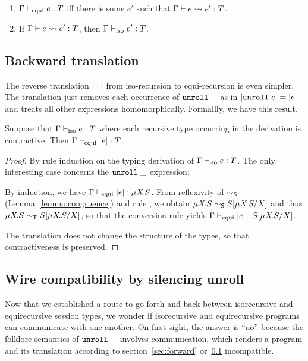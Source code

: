 \begin{lemma}
  \begin{enumerate}
  \item $\typing{\tyEqui e} T$ iff there is some $e'$ such that
    $\translation e {e'} T$.
  \item If $\translation e {e'} T$, then $\typing{\tyIso e'} T$.
  \end{enumerate}
\end{lemma}

\subsection{Backward translation}
\label{sec:backward-translation}

The reverse translation $\IsoToEqui\cdot$ from iso-recursion to equi-recursion is even
simpler. The translation just removes each occurrence of $\EUnroll\_$
as in $\IsoToEqui{\EUnroll e} = \IsoToEqui e$ and treats all other
expressions homomorphically. Formallly, we have this result.
\begin{lemma}
  Suppose that $\typing{\tyIso e}T$ where each recursive type
  occurring in the derivation is contractive.
  Then $\typing{\tyEqui \IsoToEqui{e}}T$.
\end{lemma}
\begin{proof}
  By rule induction on the typing derivation of  $\typing{\tyIso
    e}T$. The only interesting case concerns the $\EUnroll\_$
  expression:
  \begin{mathpar}
  \end{mathpar}
  By induction, we have $\typing{\tyEqui \IsoToEqui{e}}{\TRec S}$.
  From reflexivity of $\eqs$ (Lemma~\ref{lemma:congruence}) and rule
  {\EqUnrollL}, we obtain $\TRec S 
  \eqs S[\TRec[X\!] S / X]$ and thus  $\TRec S 
  \eqt S[\TRec[X\!] S / X]$, so that the conversion rule yields
  $\typing{\tyEqui \IsoToEqui{e}}{S[\TRec[X\!] S / X]}$.

  The translation does not change the structure of the types, so that
  contractiveness is preserved.
\end{proof}

\subsection{Wire compatibility by silencing unroll}
\label{sec:wire-compatibility}

Now that we established a route to go forth and back between
isorecursive and equirecursive session types, we wonder if
isorecursive and equirecursive programs can communicate with one
another. On first sight, the answer is ``no'' because the folklore
semantics of $\EUnroll\_$ involves communication, which renders a
program and its translation according to section~\ref{sec:forward}
or~\ref{sec:backward-translation} incompatible.

